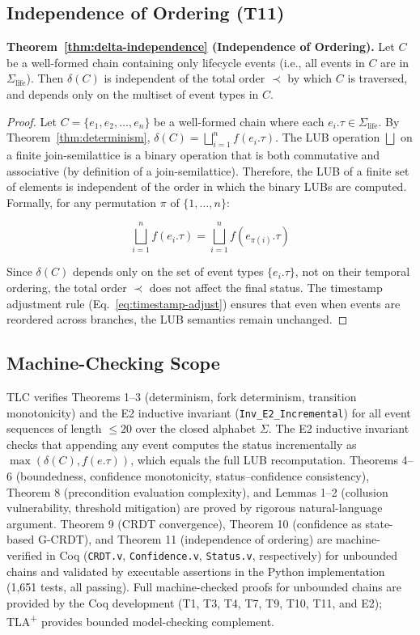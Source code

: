 \subsection{Independence of Ordering (T11)}

\textbf{Theorem~\ref{thm:delta-independence} (Independence of Ordering).} Let $C$ be a well-formed chain containing only lifecycle events (i.e., all events in $C$ are in $\Sigma_{\text{life}}$). Then $\delta(C)$ is independent of the total order $\prec$ by which $C$ is traversed, and depends only on the multiset of event types in $C$.

\begin{proof}
Let $C = \{e_1, e_2, \dots, e_n\}$ be a well-formed chain where each $e_i.\tau \in \Sigma_{\text{life}}$. By Theorem~\ref{thm:determinism}, $\delta(C) = \bigsqcup_{i=1}^{n} f(e_i.\tau)$. The LUB operation $\bigsqcup$ on a finite join-semilattice is a binary operation that is both commutative and associative (by definition of a join-semilattice). Therefore, the LUB of a finite set of elements is independent of the order in which the binary LUBs are computed. Formally, for any permutation $\pi$ of $\{1, \dots, n\}$:

\[
\bigsqcup_{i=1}^{n} f(e_i.\tau) = \bigsqcup_{i=1}^{n} f(e_{\pi(i)}.\tau)
\]

Since $\delta(C)$ depends only on the set of event types $\{e_i.\tau\}$, not on their temporal ordering, the total order $\prec$ does not affect the final status. The timestamp adjustment rule (Eq.~\ref{eq:timestamp-adjust}) ensures that even when events are reordered across branches, the LUB semantics remain unchanged.
\end{proof}

\subsection{Machine-Checking Scope}

TLC verifies Theorems 1--3 (determinism, fork determinism, transition monotonicity) and the E2 inductive invariant (\texttt{Inv\_E2\_Incremental}) for all event sequences of length $\leq 20$ over the closed alphabet $\Sigma$. The E2 inductive invariant checks that appending any event computes the status incrementally as $\max(\delta(C), f(e.\tau))$, which equals the full LUB recomputation. Theorems 4--6 (boundedness, confidence monotonicity, status--confidence consistency), Theorem 8 (precondition evaluation complexity), and Lemmas 1--2 (collusion vulnerability, threshold mitigation) are proved by rigorous natural-language argument. Theorem 9 (CRDT convergence), Theorem 10 (confidence as state-based G-CRDT), and Theorem 11 (independence of ordering) are machine-verified in Coq (\texttt{CRDT.v}, \texttt{Confidence.v}, \texttt{Status.v}, respectively) for unbounded chains and validated by executable assertions in the Python implementation (1,651 tests, all passing). Full machine-checked proofs for unbounded chains are provided by the Coq development (T1, T3, T4, T7, T9, T10, T11, and E2); TLA\textsuperscript{+} provides bounded model-checking complement.
